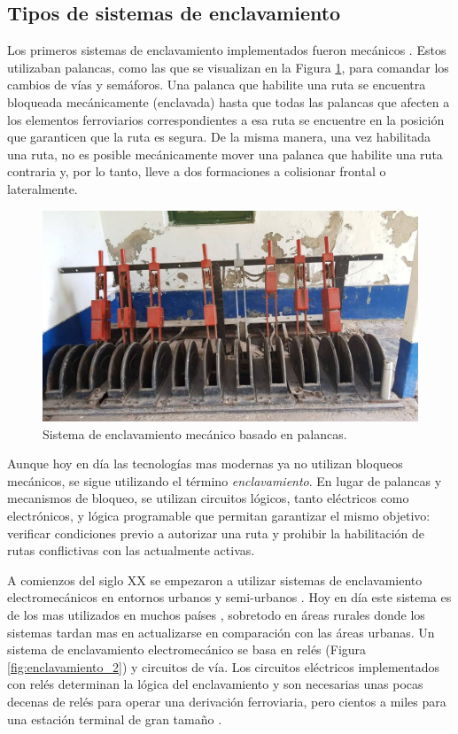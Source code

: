 \subsection{Tipos de sistemas de enclavamiento}
	\label{sec:FPGA}
	
    Los primeros sistemas de enclavamiento implementados fueron mecánicos \cite{Paper_179}. Estos utilizaban palancas, como las que se visualizan en la Figura \ref{fig:enclavamiento_1}, para comandar los cambios de vías y semáforos. Una palanca que habilite una ruta se encuentra bloqueada mecánicamente (enclavada) hasta que todas las palancas que afecten a los elementos ferroviarios correspondientes a esa ruta se encuentre en la posición que garanticen que la ruta es segura. De la misma manera, una vez habilitada una ruta, no es posible mecánicamente mover una palanca que habilite una ruta contraria y, por lo tanto, lleve a dos formaciones a colisionar frontal o lateralmente.
    
        \begin{figure}[H]
            \centering
            \includegraphics[width=1\textwidth]{Figuras/palancas.jpg}
            \centering\caption{Sistema de enclavamiento mecánico basado en palancas.}
            \label{fig:enclavamiento_1}
        \end{figure}

    Aunque hoy en día las tecnologías mas modernas ya no utilizan bloqueos mecánicos, se sigue utilizando el término \textit{enclavamiento}. En lugar de palancas y mecanismos de bloqueo, se utilizan circuitos lógicos, tanto eléctricos como electrónicos, y lógica programable que permitan garantizar el mismo objetivo: verificar condiciones previo a autorizar una ruta y prohibir la habilitación de rutas conflictivas con las actualmente activas.

    A comienzos del siglo XX se empezaron a utilizar sistemas de enclavamiento electromecánicos en entornos urbanos y semi-urbanos \cite{Paper_1}. Hoy en día este sistema es de los mas utilizados en muchos países \cite{Paper_179}, sobretodo en áreas rurales donde los sistemas tardan mas en actualizarse en comparación con las áreas urbanas. Un sistema de enclavamiento electromecánico se basa en relés (Figura \ref{fig:enclavamiento_2}) y circuitos de vía. Los circuitos eléctricos implementados con relés determinan la lógica del enclavamiento y son necesarias unas pocas decenas de relés para operar una derivación ferroviaria, pero cientos a miles para una estación terminal de gran tamaño \cite{Paper_199}.

